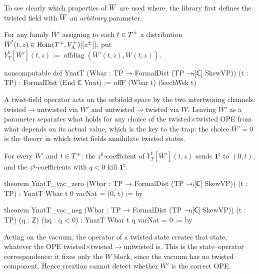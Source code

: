 To see clearly which properties of $\overline{W}$ are used where, the library first defines the
twisted field with $\overline{W}$ an \emph{arbitrary} parameter.

\begin{definition}\label{ch10:def:YnatT}
For any family $\overline{W}'$ assigning to each $t\in T^{+}$ a distribution
$\overline{W}'(t,z)\in\operatorname{Hom}(T^{+},V_{\Lambda}^{+})[[z^\pm]]$, put
$Y^\natural_T[\overline W'](t,z):=\operatorname{offdiag}(\overline W'(t,z),W(t,z))$.
\end{definition}
\begin{leancode}
noncomputable def YnatT (Wbar : TP → FormalDist (TP →ₗ[ℂ] SkewVP)) (t : TP) :
    FormalDist (End ℂ Vnat) :=
  offF (Wbar t) (leechWsk t)
\end{leancode}

\begin{physics}
A twist-field operator acts on the orbifold space by the two intertwining channels: twisted$\to$untwisted via $\overline W'$ and untwisted$\to$twisted via $W$. Leaving $\overline W'$ as a parameter separates what holds for any choice of the twisted$\times$twisted OPE from what depends on its actual value, which is the key to the trap: the choice $\overline W'=0$ is the theory in which twist fields annihilate twisted states.
\end{physics}

\begin{proposition}\label{ch10:prop:YnatTvac}
For every $\overline W'$ and $t\in T^{+}$: the $z^0$-coefficient of $Y^\natural_T[\overline W'](t,z)$
sends $\mathbf1^\natural$ to $(0,t)$, and the $z^q$-coefficients with $q<0$ kill $\mathbf1^\natural$.
\end{proposition}
\begin{leancode}
theorem YnatT_vac_zero (Wbar : TP → FormalDist (TP →ₗ[ℂ] SkewVP)) (t : TP) :
    YnatT Wbar t 0 vacNat = (0, t) := by

theorem YnatT_vac_neg (Wbar : TP → FormalDist (TP →ₗ[ℂ] SkewVP)) (t : TP) (q : ℤ) (hq : q < 0) :
    YnatT Wbar t q vacNat = 0 := by
\end{leancode}

\begin{physics}
Acting on the vacuum, the operator of a twisted state creates that state, whatever the OPE twisted$\times$twisted$\to$untwisted is. This is the state--operator correspondence: it fixes only the $W$ block, since the vacuum has no twisted component. Hence creation cannot detect whether $\overline W'$ is the correct OPE.
\end{physics}

